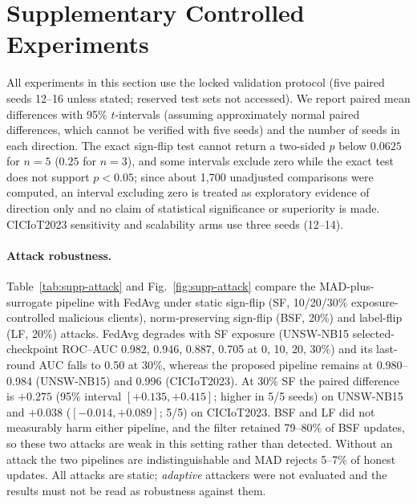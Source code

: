 \section{Supplementary Controlled Experiments}
\label{sec:supplementary}

All experiments in this section use the locked validation protocol (five paired seeds 12--16 unless stated; reserved test sets not accessed). We report paired mean differences with 95\% $t$-intervals (assuming approximately normal paired differences, which cannot be verified with five seeds) and the number of seeds in each direction. The exact sign-flip test cannot return a two-sided $p$ below $0.0625$ for $n=5$ ($0.25$ for $n=3$), and some intervals exclude zero while the exact test does not support $p<0.05$; since about 1{,}700 unadjusted comparisons were computed, an interval excluding zero is treated as exploratory evidence of direction only and no claim of statistical significance or superiority is made. CICIoT2023 sensitivity and scalability arms use three seeds (12--14).

\paragraph{Attack robustness.} Table~\ref{tab:supp-attack} and Fig.~\ref{fig:supp-attack} compare the MAD-plus-surrogate pipeline with FedAvg under static sign-flip (SF, 10/20/30\% exposure-controlled malicious clients), norm-preserving sign-flip (BSF, 20\%) and label-flip (LF, 20\%) attacks. FedAvg degrades with SF exposure (UNSW-NB15 selected-checkpoint ROC--AUC 0.982, 0.946, 0.887, 0.705 at 0, 10, 20, 30\%) and its last-round AUC falls to 0.50 at 30\%, whereas the proposed pipeline remains at 0.980--0.984 (UNSW-NB15) and 0.996 (CICIoT2023). At 30\% SF the paired difference is $+0.275$ (95\% interval $[+0.135,+0.415]$; higher in 5/5 seeds) on UNSW-NB15 and $+0.038$ ($[-0.014,+0.089]$; 5/5) on CICIoT2023. BSF and LF did not measurably harm either pipeline, and the filter retained 79--80\% of BSF updates, so these two attacks are weak in this setting rather than detected. Without an attack the two pipelines are indistinguishable and MAD rejects 5--7\% of honest updates. All attacks are static; \emph{adaptive} attackers were not evaluated and the results must not be read as robustness against them.

